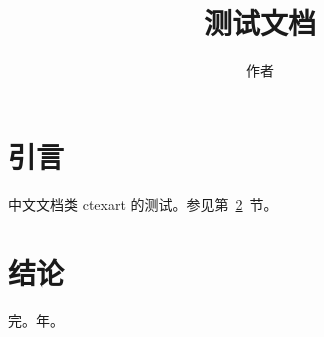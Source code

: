 \documentclass[fontset=fandol]{ctexart}
\title{测试文档}
\author{作者}
\date{}
\begin{document}
\maketitle
\tableofcontents
\section{引言}
中文文档类 ctexart 的测试。参见第~\ref{sec:b}~节。
\section{结论}\label{sec:b}
完。年。
\end{document}
